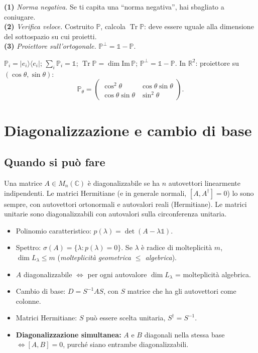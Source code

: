\documentclass[11pt,a4paper,openany]{book}
\theoremstyle{definition}
\newcommand{\R}{\mathbb{R}}
\newcommand{\C}{\mathbb{C}}
\newcommand{\ket}[1]{|#1\rangle}
\newcommand{\bra}[1]{\langle#1|}
\DeclareMathOperator{\Tr}{Tr}
\begin{document}
\begin{trucco}
\textbf{(1)} \emph{Norma negativa.} Se ti capita una ``norma negativa'', hai sbagliato a coniugare. \\
\textbf{(2)} \emph{Verifica veloce.} Costruito $\mathbb P$, calcola $\Tr\mathbb P$: deve essere uguale alla dimensione del sottospazio su cui proietti. \\
\textbf{(3)} \emph{Proiettore sull'ortogonale.} $\mathbb P^\perp=\mathbb 1-\mathbb P$.
\end{trucco}

\begin{formulario}
$\mathbb P_i=\ket{e_i}\bra{e_i}$; $\sum_i\mathbb P_i=\mathbb 1$; $\Tr\mathbb P=\dim\mathrm{Im}\,\mathbb P$; $\mathbb P^\perp=\mathbb 1-\mathbb P$. In $\R^2$: proiettore su $(\cos\theta,\sin\theta)$:
$$\mathbb P_\theta=\begin{pmatrix}\cos^2\theta & \cos\theta\sin\theta\\ \cos\theta\sin\theta & \sin^2\theta\end{pmatrix}.$$
\end{formulario}

\chapter{Diagonalizzazione e cambio di base}

\section{Quando si pu\`o fare}
Una matrice $A\in M_n(\C)$ \`e diagonalizzabile se ha $n$ autovettori linearmente indipendenti. Le matrici Hermitiane (e in generale normali, $[A,A^\dagger]=0$) lo sono sempre, con autovettori ortonormali e autovalori reali (Hermitiane). Le matrici unitarie sono diagonalizzabili con autovalori sulla circonferenza unitaria.

\begin{teoria}
\begin{itemize}
\item Polinomio caratteristico: $p(\lambda)=\det(A-\lambda\mathbb 1)$.
\item Spettro: $\sigma(A)=\{\lambda: p(\lambda)=0\}$. Se $\lambda$ \`e radice di molteplicit\`a $m$, $\dim L_\lambda\le m$ (\emph{molteplicit\`a geometrica $\le$ algebrica}).
\item $A$ diagonalizzabile $\iff$ per ogni autovalore $\dim L_\lambda$ = molteplicit\`a algebrica.
\item Cambio di base: $D=S^{-1}AS$, con $S$ matrice che ha gli autovettori come colonne.
\item Matrici Hermitiane: $S$ pu\`o essere scelta unitaria, $S^\dagger=S^{-1}$.
\item \textbf{Diagonalizzazione simultanea:} $A$ e $B$ diagonali nella stessa base $\iff [A,B]=0$, purch\'e siano entrambe diagonalizzabili.
\end{itemize}
\end{teoria}
\end{document}
